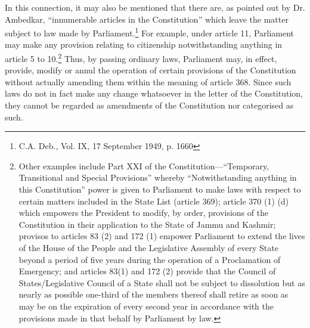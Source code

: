 \begin{multicols}{2}
\vspace{-.15cm}

\noi
In this connection, it may also be mentioned that there are, as pointed out by Dr. Ambedkar,
“innumerable articles in the Constitution” which leave the matter subject to law made by
Parliament.\footnote{C.A. Deb., Vol. IX, 17 September 1949, p. 1660} For example, under article 11, Parliament may make any provision relating to
citizenship notwithstanding anything in article 5 to 10.\footnote{Other examples include Part XXI of the Constitution—“Temporary, Transitional and Special Provisions” whereby “Notwithstanding anything in this Constitution” power is given to Parliament to make laws with respect to certain matters included in the State List (article 369); article 370 (1) (d) which empowers the President to modify, by order, provisions of the Constitution in their application to the State of Jammu and Kashmir; provisos to articles 83 (2) and 172 (1) empower Parliament to extend the lives of the House of the People and the Legislative
Assembly of every State beyond a period of five years during the operation of a Proclamation of Emergency; and
articles 83(1) and 172 (2) provide that the Council of States/Legislative Council of a State shall not be subject to
dissolution but as nearly as possible one-third of the members thereof shall retire as soon as may be on the
expiration of every second year in accordance with the provisions made in that behalf by Parliament by law.} Thus, by passing ordinary laws,
Parliament may, in effect, provide, modify or annul the operation of certain provisions of the
Constitution without actually amending them within the meaning of article 368. Since such
laws do not in fact make any change whatsoever in the letter of the Constitution, they cannot
be regarded as amendments of the Constitution nor categorised as such.


\end{multicols}
